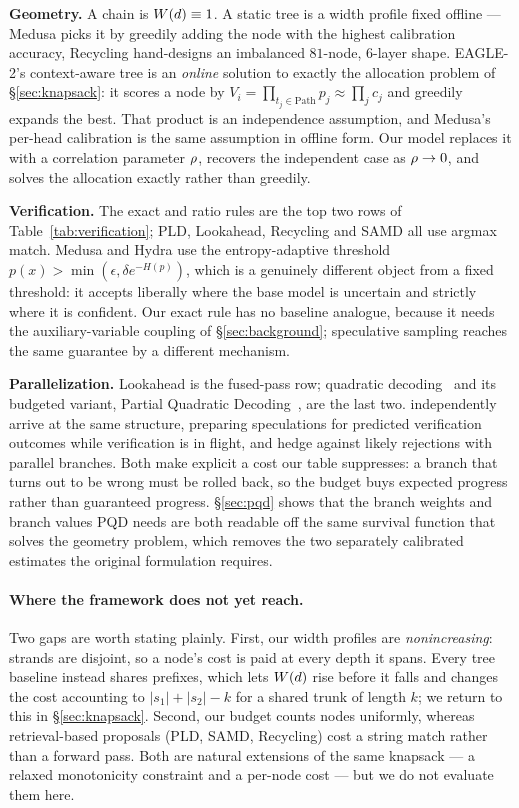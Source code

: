 \documentclass{article} %
\makeatletter
\newenvironment{ai}
  {\color{lightgray}%
   \@ifpackageloaded{caption}{\captionsetup{font={color=lightgray}}}{}%
   \let\ai@savedfloatreset\@floatboxreset
   \g@addto@macro\@floatboxreset{\color{lightgray}}}
  {\global\let\@floatboxreset\ai@savedfloatreset}
\makeatother
\begin{document}
\begin{ai}
\textbf{Geometry.} A chain is $W(d) \equiv 1$. A static tree is a width
profile fixed offline --- Medusa picks it by greedily adding the node with the
highest calibration accuracy, Recycling hand-designs an imbalanced $81$-node,
$6$-layer shape. EAGLE-2's context-aware tree is an \emph{online} solution to
exactly the allocation problem of \S\ref{sec:knapsack}: it scores a node by
$V_i = \prod_{t_j \in \mathrm{Path}} p_j \approx \prod_j c_j$ and greedily
expands the best. That product is an independence assumption, and Medusa's
per-head calibration is the same assumption in offline form. Our model replaces
it with a correlation parameter $\rho$, recovers the independent case as
$\rho \to 0$, and solves the allocation exactly rather than greedily.

\textbf{Verification.} The exact and ratio rules are the top two rows of
Table~\ref{tab:verification}; PLD, Lookahead, Recycling and SAMD all use argmax
match. Medusa and Hydra use the entropy-adaptive threshold
$p(x) > \min(\epsilon, \delta e^{-H(p)})$, which is a genuinely different object
from a fixed threshold: it accepts liberally where the base model is uncertain
and strictly where it is confident. Our exact rule has no baseline analogue,
because it needs the auxiliary-variable coupling of \S\ref{sec:background};
speculative sampling reaches the same guarantee by a different mechanism.

\textbf{Parallelization.} Lookahead is the fused-pass row; quadratic
decoding~\citep{samragh2025future} and its budgeted variant, Partial Quadratic
Decoding~\citep{draxler2025ptp}, are the last two.
\citet{kumar2026ssd} independently arrive at the same structure, preparing
speculations for predicted verification outcomes while verification is in
flight, and \citet{shen2026specbranch} hedge against likely rejections with
parallel branches. Both make explicit a cost our table suppresses: a branch that
turns out to be wrong must be rolled back, so the budget buys expected progress
rather than guaranteed progress. \S\ref{sec:pqd} shows that the branch
weights and branch values PQD needs are both readable off the same survival
function that solves the geometry problem, which removes the two separately
calibrated estimates the original formulation requires.

\paragraph{Where the framework does not yet reach.}
Two gaps are worth stating plainly. First, our width profiles are
\emph{nonincreasing}: strands are disjoint, so a node's cost is paid at every
depth it spans. Every tree baseline instead shares prefixes, which lets
$W(d)$ rise before it falls and changes the cost accounting to
$|s_1| + |s_2| - k$ for a shared trunk of length $k$; we return to this in
\S\ref{sec:knapsack}. Second, our budget counts nodes uniformly, whereas
retrieval-based proposals (PLD, SAMD, Recycling) cost a string match rather than
a forward pass. Both are natural extensions of the same knapsack --- a relaxed
monotonicity constraint and a per-node cost --- but we do not evaluate them here.


\end{ai}
\end{document}
